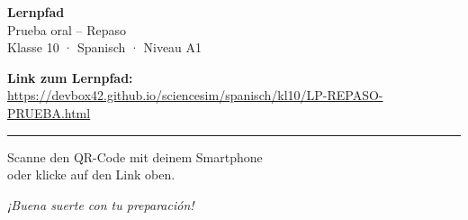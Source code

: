 \documentclass[11pt, a4paper]{article}
\begin{document}
\begin{center}

\vspace*{2cm}

{\LARGE\bfseries Lernpfad}\\[8pt]
{\Large Prueba oral -- Repaso}\\[4pt]
{\normalsize Klasse 10 · Spanisch · Niveau A1}

\vspace{2cm}


\vspace{1.5cm}

{\large\textbf{Link zum Lernpfad:}}\\[8pt]
\url{https://devbox42.github.io/sciencesim/spanisch/kl10/LP-REPASO-PRUEBA.html}

\vspace{2cm}

\textcolor{spanischrot}{\rule{8cm}{1pt}}

\vspace{1cm}

{\small Scanne den QR-Code mit deinem Smartphone\\oder klicke auf den Link oben.}

\vspace{1cm}

{\footnotesize\textit{¡Buena suerte con tu preparación!}}

\end{center}
\end{document}
